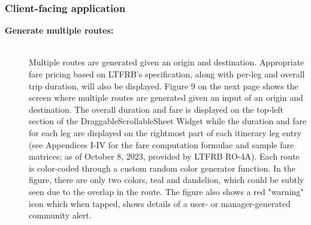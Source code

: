 \documentclass[journal]{./IEEE/IEEEtran}
\begin{document}
\newpage

\subsubsection{\textbf{Client-facing application}}

\begin{description}

    \item[\textbf{Generate multiple routes:}] \hfill \\
        Multiple routes are generated given an origin and destination. Appropriate fare pricing based on LTFRB's specification, along with per-leg and overall trip duration, will also be displayed.
Figure 9 on the next page shows the screen where multiple routes are generated given an input of an origin and destination.
The overall duration and fare is displayed on the top-left section of the DraggableScrollableSheet Widget while the duration and fare for each leg are displayed on the rightmost part of each itinerary leg entry (see Appendices I-IV for the fare computation formulae and sample fare matrices; as of October 8, 2023, provided by LTFRB RO-4A).
Each route is color-coded through a custom random color generator function. In the figure, there are only two colors, teal and dandelion, which could be subtly seen due to the overlap in the route.
The figure also shows a red "warning" icon which when tapped, shows details of a user- or manager-generated community alert.

\newpage


\end{description}
\end{document}
